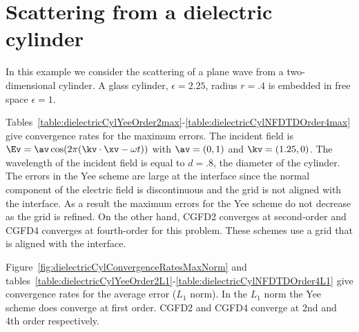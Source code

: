 \documentclass[11pt]{article}
\begin{document}



\clearpage
\section{Scattering from a dielectric cylinder}\label{sec:dielectricCylinder}

In this example we consider the scattering of a plane wave from a
two-dimensional cylinder. 
A glass cylinder, $\epsilon=2.25$, radius $r=.4$ is embedded in free space $\epsilon=1$. 


Tables~\ref{table:dielectricCylYeeOrder2max}-\ref{table:dielectricCylNFDTDOrder4max}
give convergence rates for the maximum errors. The incident field is $\Ev = \av \cos(2\pi(\kv\cdot\xv - \omega t) )$ with
$\av=( 0, 1)$ and $\kv=(1.25,0)$. The wavelength of the incident field is equal to $d=.8$, the diameter of the cylinder.
The errors in the Yee scheme are large at the interface since the normal component of the
electric field is discontinuous and the grid is not aligned with the interface.
As a result the maximum errors for the Yee scheme do not decrease as the grid is refined. 
On the other hand, CGFD2 converges at second-order
and CGFD4 converges at fourth-order for this problem. These schemes use a grid that is aligned with the interface.

Figure~\ref{fig:dielectricCylConvergenceRatesMaxNorm} and tables~\ref{table:dielectricCylYeeOrder2L1}-\ref{table:dielectricCylNFDTDOrder4L1} 
give convergence rates for the average error ($L_1$ norm).
In the $L_1$ norm the Yee scheme does converge at first order. CGFD2 and CGFD4 converge
at 2nd and 4th order respectively.
\end{document}
